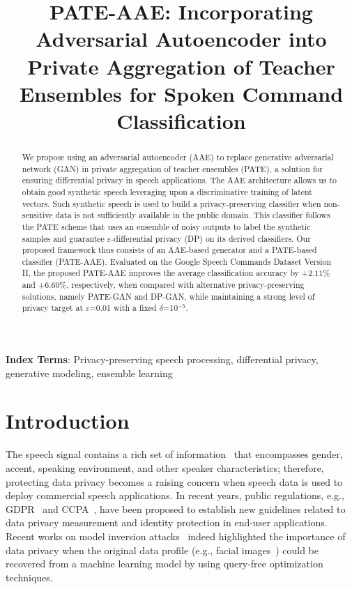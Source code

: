 \documentclass[a4paper]{article}
\title{PATE-AAE: Incorporating Adversarial Autoencoder into Private Aggregation of Teacher Ensembles for Spoken Command Classification}
\begin{document}
\maketitle
\begin{abstract}
  We propose using an adversarial autoencoder (AAE) to replace generative adversarial network (GAN) in private aggregation of teacher ensembles (PATE), a solution for ensuring differential privacy in speech applications. The AAE architecture allows us to obtain good synthetic speech leveraging upon a discriminative training of latent vectors. Such synthetic speech is used to build a privacy-preserving classifier when non-sensitive data is  not sufficiently available in the public domain. This classifier follows the PATE scheme that uses an ensemble of noisy outputs to label the synthetic samples and guarantee $\varepsilon$-differential privacy (DP) on its derived classifiers.
  Our proposed framework thus consists of an AAE-based generator and a PATE-based classifier (PATE-AAE). Evaluated on the Google Speech Commands Dataset Version II, the proposed PATE-AAE improves the average classification accuracy by +$2.11\%$ and +$6.60\%$, respectively, when compared with alternative privacy-preserving solutions, namely PATE-GAN and DP-GAN, while maintaining a strong level of privacy target at $\varepsilon$=0.01 with a fixed $\delta$=10$^{-5}$.
\end{abstract}
\noindent\textbf{Index Terms}: Privacy-preserving speech processing, differential privacy, generative modeling, ensemble learning

\section{Introduction}
The speech signal contains a rich set of information~\cite{pathak2013privacy} that encompasses gender, accent, speaking environment, and other speaker characteristics; therefore, protecting data privacy becomes a raising concern when speech data is used to deploy commercial speech applications. In recent years, public regulations, e.g., GDPR~\cite{voigt2017eu} and CCPA~\cite{shatz2020california}, have been proposed to establish new guidelines related to data privacy measurement and identity protection in end-user applications. Recent works on model inversion attacks~\cite{fredrikson2015model, carlini2020extracting} indeed highlighted the importance of data privacy when the original data profile (e.g., facial images~\cite{fredrikson2015model}) could be recovered from a machine learning model by using query-free optimization techniques.
\end{document}
